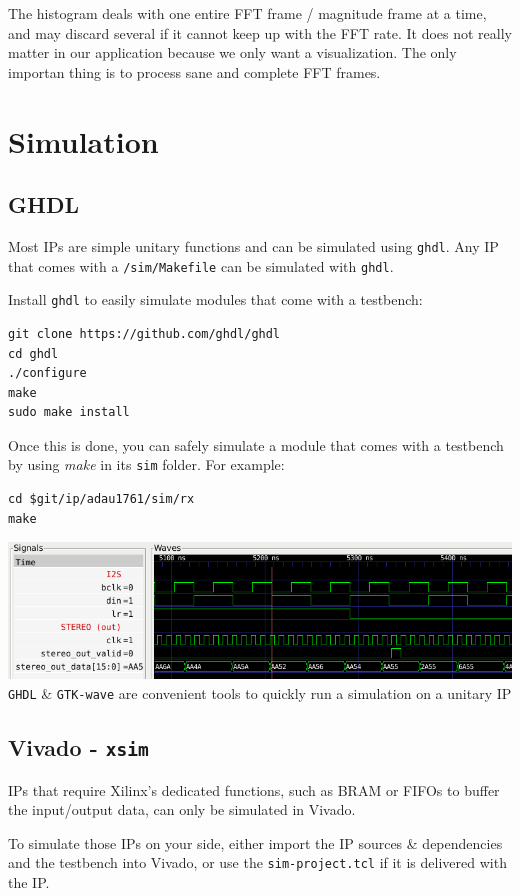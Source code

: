 \documentclass{article}
\begin{document}

The histogram deals with one entire FFT frame / magnitude frame
at a time, and may discard several if it cannot keep up with
the FFT rate. It does not really matter in our application
because we only want a visualization. The only
importan thing is to process sane and complete FFT frames.

\newpage
\section{Simulation}
\subsection{GHDL}

Most IPs are simple unitary functions
and can be simulated using {\tt ghdl}.
Any IP that comes with a {\tt /sim/Makefile}
can be simulated with {\tt ghdl}.

Install {\tt ghdl} to easily
simulate modules that come with a testbench:

\begin{verbatim}
git clone https://github.com/ghdl/ghdl
cd ghdl
./configure
make
sudo make install
\end{verbatim}

Once this is done, you can safely simulate a module
that comes with a testbench by using {\it make}
in its {\tt sim} folder.
For example:

\begin{verbatim}
cd $git/ip/adau1761/sim/rx
make
\end{verbatim}

\begin{center}
	\includegraphics[width=0.75\linewidth]{ghdl-gtkw.png} \\
	{\tt GHDL} \& {\tt GTK-wave} are convenient
	tools to quickly run a simulation on a unitary IP
\end{center}

\subsection{Vivado - {\tt xsim}}

IPs that require Xilinx's dedicated functions,
such as BRAM or FIFOs to buffer the input/output
data, can only be simulated in Vivado.

To simulate those IPs on your side, either
import the IP sources \& dependencies and the testbench
into Vivado, or use the {\tt sim-project.tcl} if
it is delivered with the IP.
\end{document}
